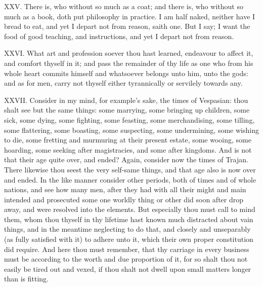 XXV. There is, who without so much as a coat; and there is, who without
so much as a book, doth put philosophy in practice. I am half naked,
neither have I bread to eat, and yet I depart not from reason, saith one.
But I say; I want the food of good teaching, and instructions, and yet I
depart not from reason.

XXVI. What art and profession soever thou hast learned, endeavour to
affect it, and comfort thyself in it; and pass the remainder of thy life
as one who from his whole heart commits himself and whatsoever belongs
unto him, unto the gods: and as for men, carry not thyself either
tyrannically or servilely towards any.

XXVII. Consider in my mind, for example's sake, the times of Vespasian:
thou shalt see but the same things: some marrying, some bringing up
children, some sick, some dying, some fighting, some feasting, some
merchandising, some tilling, some flattering, some boasting, some
suspecting, some undermining, some wishing to die, some fretting and
murmuring at their present estate, some wooing, some hoarding, some
seeking after magistracies, and some after kingdoms. And is not that their
age quite over, and ended? Again, consider now the times of Trajan. There
likewise thou seest the very self-same things, and that age also is now
over and ended. In the like manner consider other periods, both of times
and of whole nations, and see how many men, after they had with all their
might and main intended and prosecuted some one worldly thing or other did
soon after drop away, and were resolved into the elements. But especially
thou must call to mind them, whom thou thyself in thy lifetime hast known
much distracted about vain things, and in the meantime neglecting to do
that, and closely and unseparably (as fully satisfied with it) to adhere
unto it, which their own proper constitution did require. And here thou
must remember, that thy carriage in every business must be according to
the worth and due proportion of it, for so shalt thou not easily be tired
out and vexed, if thou shalt not dwell upon small matters longer than is
fitting.

